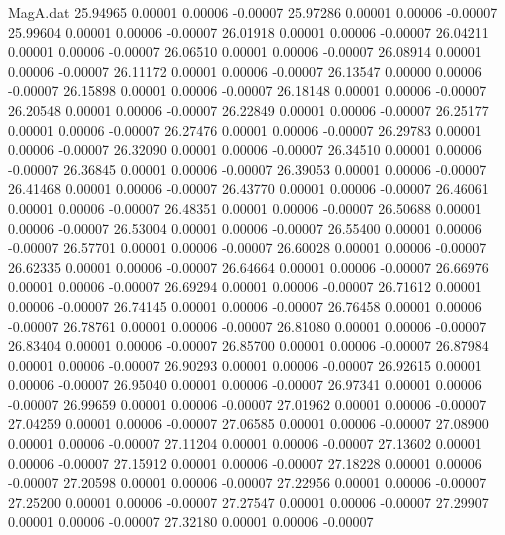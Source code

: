 \begin{filecontents}{MagA.dat}
  25.94965    0.00001    0.00006   -0.00007
  25.97286    0.00001    0.00006   -0.00007
  25.99604    0.00001    0.00006   -0.00007
  26.01918    0.00001    0.00006   -0.00007
  26.04211    0.00001    0.00006   -0.00007
  26.06510    0.00001    0.00006   -0.00007
  26.08914    0.00001    0.00006   -0.00007
  26.11172    0.00001    0.00006   -0.00007
  26.13547    0.00000    0.00006   -0.00007
  26.15898    0.00001    0.00006   -0.00007
  26.18148    0.00001    0.00006   -0.00007
  26.20548    0.00001    0.00006   -0.00007
  26.22849    0.00001    0.00006   -0.00007
  26.25177    0.00001    0.00006   -0.00007
  26.27476    0.00001    0.00006   -0.00007
  26.29783    0.00001    0.00006   -0.00007
  26.32090    0.00001    0.00006   -0.00007
  26.34510    0.00001    0.00006   -0.00007
  26.36845    0.00001    0.00006   -0.00007
  26.39053    0.00001    0.00006   -0.00007
  26.41468    0.00001    0.00006   -0.00007
  26.43770    0.00001    0.00006   -0.00007
  26.46061    0.00001    0.00006   -0.00007
  26.48351    0.00001    0.00006   -0.00007
  26.50688    0.00001    0.00006   -0.00007
  26.53004    0.00001    0.00006   -0.00007
  26.55400    0.00001    0.00006   -0.00007
  26.57701    0.00001    0.00006   -0.00007
  26.60028    0.00001    0.00006   -0.00007
  26.62335    0.00001    0.00006   -0.00007
  26.64664    0.00001    0.00006   -0.00007
  26.66976    0.00001    0.00006   -0.00007
  26.69294    0.00001    0.00006   -0.00007
  26.71612    0.00001    0.00006   -0.00007
  26.74145    0.00001    0.00006   -0.00007
  26.76458    0.00001    0.00006   -0.00007
  26.78761    0.00001    0.00006   -0.00007
  26.81080    0.00001    0.00006   -0.00007
  26.83404    0.00001    0.00006   -0.00007
  26.85700    0.00001    0.00006   -0.00007
  26.87984    0.00001    0.00006   -0.00007
  26.90293    0.00001    0.00006   -0.00007
  26.92615    0.00001    0.00006   -0.00007
  26.95040    0.00001    0.00006   -0.00007
  26.97341    0.00001    0.00006   -0.00007
  26.99659    0.00001    0.00006   -0.00007
  27.01962    0.00001    0.00006   -0.00007
  27.04259    0.00001    0.00006   -0.00007
  27.06585    0.00001    0.00006   -0.00007
  27.08900    0.00001    0.00006   -0.00007
  27.11204    0.00001    0.00006   -0.00007
  27.13602    0.00001    0.00006   -0.00007
  27.15912    0.00001    0.00006   -0.00007
  27.18228    0.00001    0.00006   -0.00007
  27.20598    0.00001    0.00006   -0.00007
  27.22956    0.00001    0.00006   -0.00007
  27.25200    0.00001    0.00006   -0.00007
  27.27547    0.00001    0.00006   -0.00007
  27.29907    0.00001    0.00006   -0.00007
  27.32180    0.00001    0.00006   -0.00007

\end{filecontents}
